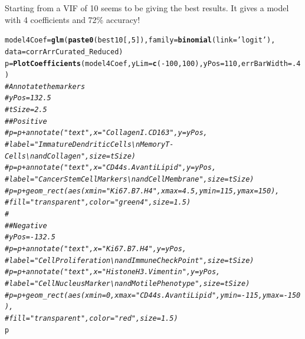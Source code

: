 \documentclass[a4paper]{article}\usepackage[]{graphicx}\usepackage[]{color}
\makeatletter
\newcommand{\hlnum}[1]{\textcolor[rgb]{0.686,0.059,0.569}{#1}}%
\newcommand{\hlstr}[1]{\textcolor[rgb]{0.192,0.494,0.8}{#1}}%
\newcommand{\hlcom}[1]{\textcolor[rgb]{0.678,0.584,0.686}{\textit{#1}}}%
\newcommand{\hlopt}[1]{\textcolor[rgb]{0,0,0}{#1}}%
\newcommand{\hlstd}[1]{\textcolor[rgb]{0.345,0.345,0.345}{#1}}%
\newcommand{\hlkwb}[1]{\textcolor[rgb]{0.69,0.353,0.396}{#1}}%
\newcommand{\hlkwc}[1]{\textcolor[rgb]{0.333,0.667,0.333}{#1}}%
\newcommand{\hlkwd}[1]{\textcolor[rgb]{0.737,0.353,0.396}{\textbf{#1}}}%
\newenvironment{kframe}{%
 \def\at@end@of@kframe{}%
 \ifinner\ifhmode%
  \def\at@end@of@kframe{\end{minipage}}%
  \begin{minipage}{\columnwidth}%
 \fi\fi%
 \def\FrameCommand##1{\hskip\@totalleftmargin \hskip-\fboxsep
 \colorbox{shadecolor}{##1}\hskip-\fboxsep
     \hskip-\linewidth \hskip-\@totalleftmargin \hskip\columnwidth}%
 \MakeFramed {\advance\hsize-\width
   \@totalleftmargin\z@ \linewidth\hsize
   \@setminipage}}%
 {\par\unskip\endMakeFramed%
 \at@end@of@kframe}
\newenvironment{knitrout}{}{} %
\makeatother
\begin{document}
Starting from a VIF of 10 seems to be giving the best results. It gives a model with 4 coefficients and 72\% accuracy!
\begin{knitrout}
\color{fgcolor}\begin{kframe}
\begin{alltt}
\hlstd{model4Coef} \hlkwb{=} \hlkwd{glm}\hlstd{(}\hlkwd{paste0}\hlstd{(best10[,}\hlnum{5}\hlstd{]),}\hlkwc{family}\hlstd{=}\hlkwd{binomial}\hlstd{(}\hlkwc{link}\hlstd{=}\hlstr{'logit'}\hlstd{),}
                           \hlkwc{data}\hlstd{=corrArrCurated_Reduced)}
\hlstd{p} \hlkwb{=} \hlkwd{PlotCoefficients}\hlstd{(model4Coef,}\hlkwc{yLim}\hlstd{=}\hlkwd{c}\hlstd{(}\hlopt{-}\hlnum{100}\hlstd{,}\hlnum{100}\hlstd{),}\hlkwc{yPos}\hlstd{=}\hlnum{110}\hlstd{,}\hlkwc{errBarWidth}\hlstd{=}\hlnum{.4}\hlstd{)}
\hlcom{# Annotate the markers}
\hlcom{# yPos = 132.5}
\hlcom{# tSize = 2.5}
\hlcom{# # Positive}
\hlcom{# p = p + annotate("text", x = "CollagenI.CD163", y = yPos,}
\hlcom{#                        label = "Immature Dendritic Cells\textbackslash{}n Memory T-Cells\textbackslash{}n and Collagen", size = tSize)}
\hlcom{# p = p + annotate("text", x = "CD44s.AvantiLipid", y = yPos,}
\hlcom{#                        label = "Cancer Stem Cell Markers\textbackslash{}n and Cell Membrane", size = tSize)}
\hlcom{# p = p + geom_rect(aes(xmin = "Ki67.B7.H4", xmax = 4.5, ymin = 115, ymax = 150),}
\hlcom{#                fill = "transparent", color = "green4", size = 1.5)}
\hlcom{# }
\hlcom{# # Negative}
\hlcom{# yPos = -132.5}
\hlcom{# p = p + annotate("text", x = "Ki67.B7.H4", y = yPos,}
\hlcom{#                        label = "Cell Proliferation \textbackslash{}n and Immune Check Point", size = tSize)}
\hlcom{# p = p + annotate("text", x = "HistoneH3.Vimentin", y = yPos,}
\hlcom{#                        label = "Cell Nucleus Marker \textbackslash{}n and Motile Phenotype", size = tSize)}
\hlcom{# p = p + geom_rect(aes(xmin = 0, xmax = "CD44s.AvantiLipid", ymin = -115, ymax = -150),}
\hlcom{#                fill = "transparent", color = "red", size = 1.5)}
\hlstd{p}
\end{alltt}


{\ttfamily\noindent\color{warningcolor}{\#\# Warning: Removed 1 rows containing missing values (geom\_text).}}

{\ttfamily\noindent\color{warningcolor}{\#\# Warning: Removed 1 rows containing missing values (geom\_text).}}


\end{kframe}
\end{knitrout}
\end{document}
